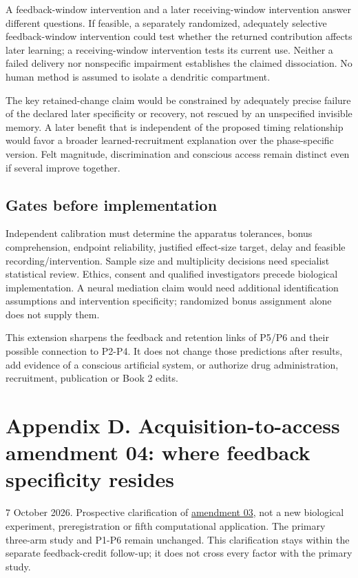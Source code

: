 \documentclass[
  american,
  11pt,
  letterpaper,
]{article}
\begin{document}
A feedback-window intervention and a later receiving-window intervention answer different questions. If feasible, a separately randomized, adequately selective feedback-window intervention could test whether the returned contribution affects later learning; a receiving-window intervention tests its current use. Neither a failed delivery nor nonspecific impairment establishes the claimed dissociation. No human method is assumed to isolate a dendritic compartment.

The key retained-change claim would be constrained by adequately precise failure of the declared later specificity or recovery, not rescued by an unspecified invisible memory. A later benefit that is independent of the proposed timing relationship would favor a broader learned-recruitment explanation over the phase-specific version. Felt magnitude, discrimination and conscious access remain distinct even if several improve together.

\subsection{Gates before implementation}\label{gates-before-implementation}

Independent calibration must determine the apparatus tolerances, bonus comprehension, endpoint reliability, justified effect-size target, delay and feasible recording/intervention. Sample size and multiplicity decisions need specialist statistical review. Ethics, consent and qualified investigators precede biological implementation. A neural mediation claim would need additional identification assumptions and intervention specificity; randomized bonus assignment alone does not supply them.

This extension sharpens the feedback and retention links of P5/P6 and their possible connection to P2-P4. It does not change those predictions after results, add evidence of a conscious artificial system, or authorize drug administration, recruitment, publication or Book 2 edits.

\clearpage
\hypertarget{appendix-d}{}

\section{Appendix D. Acquisition-to-access amendment 04: where feedback specificity resides}\label{appendix-d.-acquisition-to-access-amendment-04-where-feedback-specificity-resides}

7 October 2026. Prospective clarification of \href{https://zenodo.org/records/23455801/files/Learning-to-Feel-Technical-Supplement-v1.1.pdf\#appendix-c}{amendment 03}, not a new biological experiment, preregistration or fifth computational application. The primary three-arm study and P1-P6 remain unchanged. This clarification stays within the separate feedback-credit follow-up; it does not cross every factor with the primary study.
\end{document}
